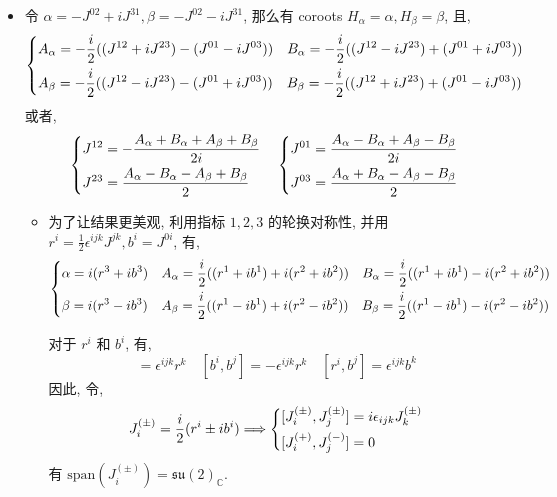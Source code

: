\begin{itemize}
	\item 令 $\alpha = - J^{0 2} + i J^{3 1}, \beta = - J^{0 2} - i J^{3 1}$, 那么有 coroots $H_\alpha = \alpha, H_\beta = \beta$, 且,
	\begin{equation}
		\begin{dcases}
			A_\alpha = - \frac{i}{2} ((J^{1 2} + i J^{2 3}) - (J^{0 1} - i J^{0 3})) \quad B_\alpha = - \frac{i}{2} ((J^{1 2} - i J^{2 3}) + (J^{0 1} + i J^{0 3})) \\
			A_\beta = - \frac{i}{2} ((J^{1 2} - i J^{2 3}) - (J^{0 1} + i J^{0 3})) \quad B_\beta = - \frac{i}{2} ((J^{1 2} + i J^{2 3}) + (J^{0 1} - i J^{0 3}))
		\end{dcases}
	\end{equation}
	或者,
	\begin{equation}
		\begin{dcases}
			J^{1 2} = - \frac{A_\alpha + B_\alpha + A_\beta + B_\beta}{2 i} \\
			J^{2 3} = \frac{A_\alpha - B_\alpha - A_\beta + B_\beta}{2}
		\end{dcases} \quad \begin{dcases}
			J^{0 1} = \frac{A_\alpha - B_\alpha + A_\beta - B_\beta}{2 i} \\
			J^{0 3} = \frac{A_\alpha + B_\alpha - A_\beta - B_\beta}{2}
		\end{dcases}
	\end{equation}
	\begin{itemize}
		\item 为了让结果更美观, 利用指标 $1, 2, 3$ 的轮换对称性, 并用 $r^i = \frac{1}{2} \epsilon^{i j k} J^{j k}, b^i = J^{0 i}$, 有,
		\begin{equation}
			\begin{dcases}
				\alpha = i (r^3 + i b^3) & A_\alpha = \frac{i}{2} ((r^1 + i b^1) + i (r^2 + i b^2)) \quad B_\alpha = \frac{i}{2} ((r^1 + i b^1) - i ( r^2 + i b^2)) \\
				\beta = i (r^3 - i b^3) & A_\beta = \frac{i}{2} ((r^1 - i b^1) + i (r^2 - i b^2)) \quad B_\beta = \frac{i}{2} ((r^1 - i b^1) - i (r^2 - i b^2))
			\end{dcases}
		\end{equation}
		
		\begin{tcolorbox}[title=calculation:]
			对于 $r^i$ 和 $b^i$, 有,
			\begin{equation}
				[r^i, r^j] = \epsilon^{i j k} r^k \quad [b^i, b^j] = - \epsilon^{i j k} r^k \quad [r^i, b^j] = \epsilon^{i j k} b^k
			\end{equation}
			因此, 令,
			\begin{equation}
				J^{(\pm)}_i = \frac{i}{2} (r^i \pm i b^i) \Longrightarrow \begin{dcases}
					[J^{(\pm)}_i, J^{(\pm)}_j] = i \epsilon_{i j k} J^{(\pm)}_k \\
					[J^{(+)}_i, J^{(-)}_j] = 0
				\end{dcases}
			\end{equation}
			有 $\mathrm{span}(J^{(\pm)}_i) = \mathfrak{su}(2)_\mathbb{C}$.
		\end{tcolorbox}
	\end{itemize}
\end{itemize}

